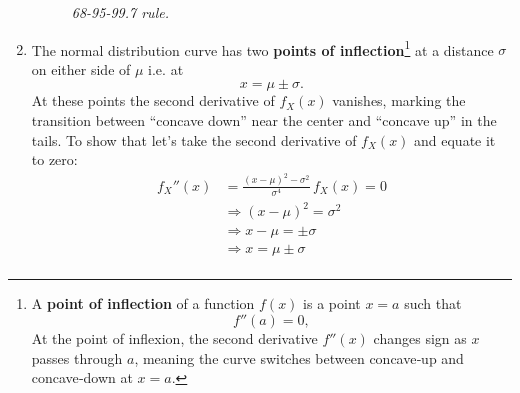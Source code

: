 \documentclass[twoside]{book}
\begin{document}
\begin{enumerate}
\begin{figure}[H]
\begin{center}
            \caption{\textit{68-95-99.7 rule.}}
        \end{center}
    \end{figure}


  \item The normal distribution curve has two \textbf{points of inflection}\footnote{A \textbf{point of inflection} of a function $f(x)$ is a point $x = a$ such that
  \[
  f''(a) = 0,
  \]
  At the point of inflexion, the second derivative $f''(x)$ changes sign as $x$ passes through $a$, meaning the curve switches between concave‐up and concave‐down at $x = a$.} at a distance $\sigma$ on either side of $\mu$ i.e. at
    \[
      x = \mu \pm \sigma.
    \]
    At these points the second derivative of \(f_X(x)\) vanishes, marking the transition between “concave down” near the center and “concave up” in the tails. To show that let's take the second derivative of $f_X(x)$ and equate it to zero:
   \begin{align*}
   f_X''(x) &= \frac{(x-\mu)^2 - \sigma^2}{\sigma^4}\,f_X(x) = 0 \\
   &\Rightarrow (x-\mu)^2 = \sigma^2 \\
   &\Rightarrow x-\mu = \pm\sigma \\
   &\Rightarrow x = \mu \pm\sigma \\
   \end{align*}


\end{enumerate}
\end{document}
